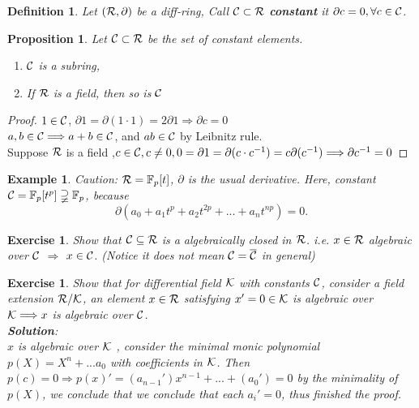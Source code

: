 \documentclass[11pt]{article}
\newtheorem{prop}[thm]{Proposition}
\newtheorem{exercise}[thm]{Exercise}
\newtheorem{dfn}[thm]{Definition}
\newtheorem{ex}[thm]{Example}
\newcommand{\pd}{\partial}
\newcommand{\bbf}{\mathbb F}
\newcommand{\calc}{{\cal C}}
\newcommand{\calk}{{\cal K}}
\newcommand{\calr}{{\cal R}}
\newcommand{\Lrta}{\Longrightarrow}
\begin{document}
\begin{dfn}
Let $(\calr, \pd)$ be a diff-ring, Call $\calc\subset\calr$ \textbf{constant} it $\pd c=0,\forall c\in \calc$.
\end{dfn}

\begin{prop}
Let $\calc\subset\calr$ be the set of constant elements.
\begin{enumerate}
\item $\calc$ is a subring,
\item If $\calr$ is a field, then so is $\calc$
\end{enumerate}
\end{prop}
\begin{proof}
$1\in\calc$, $\pd 1=\pd (1\cdot 1)=2\pd 1\Longrightarrow \pd c=0$\\
$a,b\in \calc\Longrightarrow a+b\in \calc$, and $ab\in\calc$ by Leibnitz rule.\\
Suppose $\calr$ is a field ,$c\in \calc, c\neq 0, 0=\pd 1=\pd (c\cdot c^{-1})=c\pd (c^{-1})\Longrightarrow \pd c^{-1}=0$
\end{proof}
\begin{ex}
Caution: $\calr=\bbf_p[t]$, $\pd$ is the usual derivative. Here, constant $\calc= \bbf_p[t^p]\supsetneqq \bbf_p$, because
$$
\pd(a_0+a_1 t^p+a_2 t^{2p}+...+a_n t^{np})=0.
$$
\end{ex}

\begin{exercise}
Show that $\calc \subseteq \calr$ is a algebraically closed in $\calr$. i.e. $x\in \calr$ algebraic over $\calc$ $\Longrightarrow$ $x\in \calc$. (Notice it does not mean $\calc=\overline{\calc}$ in general)
\end{exercise}

\begin{exercise}\label{exr:1.7}
Show that for differential field $\calk$ with constants $\calc$, consider a field extension $\calr/\calk$, an element $x\in \calr$ satisfying $x'=0\in \calk$  is algebraic over $\calk\Lrta x$ is algebraic over $\calc$.\\
\textbf{Solution}:\\
$x$ is algebraic over $\calk$ , consider the minimal monic polynomial $p(X)= X^n+...a_0$ with coefficients in $\calk$. Then $p(c)=0\Lrta p(x)'=(a_{n-1}')x^{n-1}+...+(a_0')=0$ by the minimality of $p(X)$, we conclude that we conclude that each $a_{i}'=0$, thus finished the proof.
\end{exercise}
\end{document}
